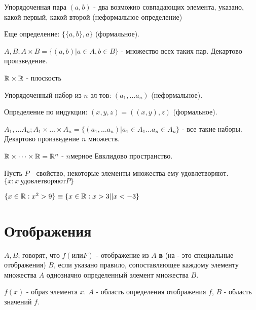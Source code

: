\documentclass[12pt]{report}
\begin{document}
\begin{defn}
Упорядоченная пара $(a, b)$ - два возможно совпадающих элемента, указано, какой первый, какой второй (неформальное определение)

Еще определение: $\{\{a, b\}, a\}$ (формальное).
\end{defn}

\begin{defn}
$A, B; A \times B = \{(a, b)| a \in A, b \in B\}$ - множество всех таких пар. Декартово произведение.
\end{defn}

\begin{ex}
$\mathbb{R} \times \mathbb{R}$ - плоскость
\end{ex}

\begin{defn}
Упорядоченный набор из $n$ эл-тов: $(a_1, \dots a_n)$ (неформальное).

Определение по индукции: $(x, y, z) = ((x, y), z)$ (формальное).

$A_1, \dots A_n; A_1 \times \dots \times A_n = \{(a_1, \dots a_n)|a_1 \in A_1 \dots a_n \in A_n\}$ - все такие наборы. Декартово произведение $n$ множеств.
\end{defn}

\begin{ex}
$\mathbb{R} \times \dots \times \mathbb{R} = \mathbb{R}^n$ - $n$мерное Евклидово пространство.
\end{ex}

\begin{name}
Пусть $P$ - свойство, некоторые элементы множества ему удовлетворяют. $\{x: x ~\mbox{удовлетворяют} P\}$

$\{x \in \mathbb{R}: x^2 > 9\} \equiv \{x \in \mathbb{R}: x > 3 || x < -3\}$
\end{name}

\section{Отображения}

\begin{defn}
$A, B$; говорят, что $f (\mbox{или} F)$ - отображение из $A$ {\bfseries в} (на - это специальные отображения) $B$, если указано правило, сопоставляющее каждому элементу множества $A$ однозначно определенный элемент множества $B$.
\end{defn}

\begin{name}
$f(x)$ - образ элемента $x$. $A$ - область определения отображения $f$, $B$ - область значений $f$.
\end{name}
\end{document}
